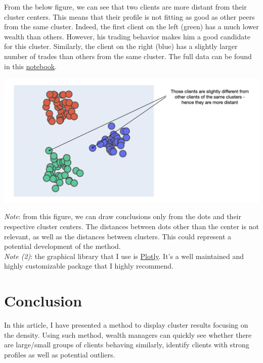 From the below figure, we can see that two clients are more distant from their cluster centers. This means that their profile is not fitting as good as other peers from the same cluster. Indeed, the first client on the left (green) has a much lower wealth than others. However, his trading behavior makes him a good candidate for this cluster. Similarly, the client on the right (blue) has a slightly larger number of trades than others from the same cluster. The full data can be found in this \href{https://github.com/savoga/clustering-visualization-article/blob/main/clustering-visualization-article.ipynb}{notebook}.

\begin{center}
\includegraphics[scale=0.5]{./../img/clusters-static-arrow.png}
\end{center}

\textit{Note}: from this figure, we can draw conclusions only from the dots and their respective cluster centers. The distances between dots other than the center is not relevant, as well as the distances between clusters. This could represent a potential development of the method. \\

\textit{Note (2)}: the graphical library that I use is \href{https://plotly.com/}{Plotly}. It's a well maintained and highly customizable package that I highly recommend.

\section{Conclusion}

In this article, I have presented a method to display cluster results focusing on the density. Using such method, wealth managers can quickly see whether there are large/small groups of clients behaving similarly, identify clients with strong profiles as well as potential outliers.

